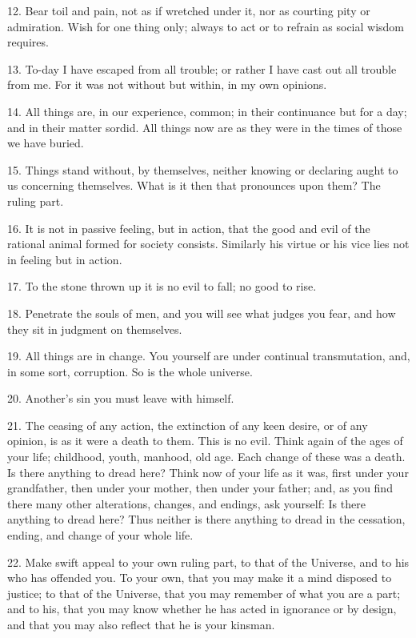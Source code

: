 \documentclass{book}
\begin{document}
12. Bear toil and pain, not as if wretched under it, nor as courting
pity or admiration. Wish for one thing only; always to act or to
refrain as social wisdom requires.

13. To-day I have escaped from all trouble; or rather I have cast out
all trouble from me. For it was not without but within, in my own
opinions.

14. All things are, in our experience, common; in their continuance
but for a day; and in their matter sordid. All things now are as they
were in the times of those we have buried.

\newpage

15. Things stand without, by themselves, neither knowing or declaring
aught to us concerning themselves. What is it then that pronounces
upon them? The ruling part.

16. It is not in passive feeling, but in action, that the good and
evil of the rational animal formed for society consists. Similarly his
virtue or his vice lies not in feeling but in action.

17. To the stone thrown up it is no evil to fall; no good to rise.

18. Penetrate the souls of men, and you will see what judges you fear,
and how they sit in judgment on themselves.

19. All things are in change. You yourself are under continual
transmutation, and, in some sort, corruption. So is the whole
universe.

20. Another's sin you must leave with himself.

21. The ceasing of any action, the extinction of any keen desire, or
of any opinion, is as it were a death to them. This is no evil. Think
again of the ages of your life; childhood, youth, manhood, old
age. Each change of these was a death. Is there anything to dread
here? Think now of your life as it was, first under your grandfather,
then under your mother, then under your father; and, as you find there
many other alterations, changes, and endings, ask yourself: Is there
anything to dread here? Thus neither is there anything to dread in the
cessation, ending, and change of your whole life.

22. Make swift appeal to your own ruling part, to that of the
Universe, and to his who has offended you. To your own, that you may
make it a mind disposed to justice; to that of the Universe, that you
may remember of what you are a part; and to his, that you may know
whether he has acted in ignorance or by design, and that you may also
reflect that he is your kinsman.
\end{document}
